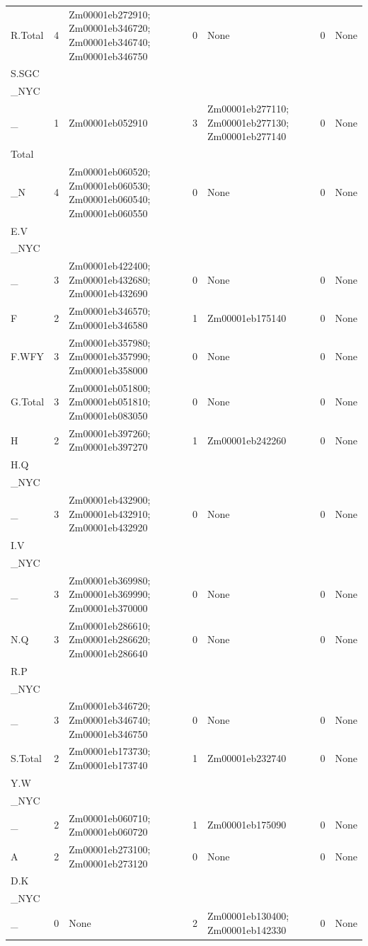 \begin{longtable}{p{1.9cm}p{0.9cm}p{4.8cm}p{0.9cm}p{4.8cm}p{0.9cm}p{3.2cm}}
R.Total & 4 & Zm00001eb272910; Zm00001eb346720; Zm00001eb346740; Zm00001eb346750 & 0 & None & 0 & None \\
S.SGC\\_NYC\\_ & 1 & Zm00001eb052910 & 3 & Zm00001eb277110; Zm00001eb277130; Zm00001eb277140 & 0 & None \\
Total\\_N & 4 & Zm00001eb060520; Zm00001eb060530; Zm00001eb060540; Zm00001eb060550 & 0 & None & 0 & None \\
E.V\\_NYC\\_ & 3 & Zm00001eb422400; Zm00001eb432680; Zm00001eb432690 & 0 & None & 0 & None \\
F & 2 & Zm00001eb346570; Zm00001eb346580 & 1 & Zm00001eb175140 & 0 & None \\
F.WFY & 3 & Zm00001eb357980; Zm00001eb357990; Zm00001eb358000 & 0 & None & 0 & None \\
G.Total & 3 & Zm00001eb051800; Zm00001eb051810; Zm00001eb083050 & 0 & None & 0 & None \\
H & 2 & Zm00001eb397260; Zm00001eb397270 & 1 & Zm00001eb242260 & 0 & None \\
H.Q\\_NYC\\_ & 3 & Zm00001eb432900; Zm00001eb432910; Zm00001eb432920 & 0 & None & 0 & None \\
I.V\\_NYC\\_ & 3 & Zm00001eb369980; Zm00001eb369990; Zm00001eb370000 & 0 & None & 0 & None \\
N.Q & 3 & Zm00001eb286610; Zm00001eb286620; Zm00001eb286640 & 0 & None & 0 & None \\
R.P\\_NYC\\_ & 3 & Zm00001eb346720; Zm00001eb346740; Zm00001eb346750 & 0 & None & 0 & None \\
S.Total & 2 & Zm00001eb173730; Zm00001eb173740 & 1 & Zm00001eb232740 & 0 & None \\
Y.W\\_NYC\\_ & 2 & Zm00001eb060710; Zm00001eb060720 & 1 & Zm00001eb175090 & 0 & None \\
A & 2 & Zm00001eb273100; Zm00001eb273120 & 0 & None & 0 & None \\
D.K\\_NYC\\_ & 0 & None & 2 & Zm00001eb130400; Zm00001eb142330 & 0 & None \\

\end{longtable}
